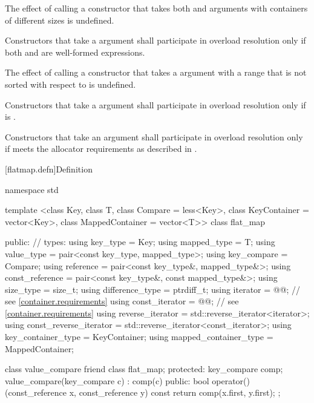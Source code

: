 \begin{codeblock}
\begin{codeblock}
\begin{codeblock}
\begin{addedblock}
\pnum
The effect of calling a constructor that takes both 
and  arguments with containers of different sizes is
undefined.

\pnum
Constructors that take a  argument  shall
participate in overload resolution only if both  and
 are well-formed expressions.

\pnum
The effect of calling a constructor that takes a 
argument with a range that is not sorted with respect to  is
undefined.

\pnum
Constructors that take a  argument shall participate in overload
resolution only if  is .

\pnum
Constructors that take an  argument shall participate in overload
resolution only if  meets the allocator requirements as described
in .

[flatmap.defn]{Definition}

\begin{codeblock}
namespace std {
  template <class Key, class T, class Compare = less<Key>,
            class KeyContainer = vector<Key>,
            class MappedContainer = vector<T>>
  class flat_map {
  public:
      // types:
      using key_type                  = Key;
      using mapped_type               = T;
      using value_type                = pair<const key_type, mapped_type>;
      using key_compare               = Compare;
      using reference                 = pair<const key_type&, mapped_type&>;
      using const_reference           = pair<const key_type&, const mapped_type&>;
      using size_type                 = size_t;
      using difference_type           = ptrdiff_t;
      using iterator                  = @@; // see \ref{container.requirements}
      using const_iterator            = @@; // see \ref{container.requirements}
      using reverse_iterator          = std::reverse_iterator<iterator>;
      using const_reverse_iterator    = std::reverse_iterator<const_iterator>;
      using key_container_type        = KeyContainer;
      using mapped_container_type     = MappedContainer;

      class value_compare {
        friend class flat_map;
      protected:
        key_compare comp;
        value_compare(key_compare c) : comp(c) { }
      public:
        bool operator()(const_reference x, const_reference y) const {
          return comp(x.first, y.first);
        }
      };

}}
\end{codeblock}
\end{addedblock}
\end{codeblock}
\end{codeblock}
\end{codeblock}
